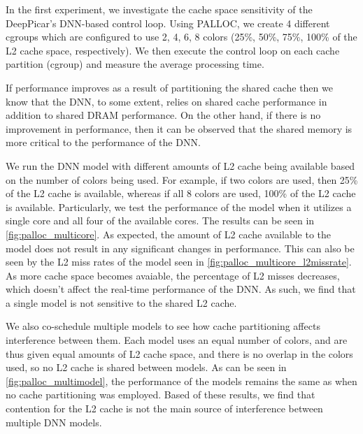 
In the first experiment, we investigate the cache space sensitivity of
the DeepPicar's DNN-based control loop. Using PALLOC, we create 4
different cgroups which are configured to use 2, 4,
6, 8 colors (25\%, 50\%, 75\%, 100\% of the L2 cache
space, respectively). We then execute the control loop on each cache
partition (cgroup) and measure the average processing time. 

If performance improves as a result of partitioning the shared cache 
then we know that the DNN, to some extent, relies on shared cache 
performance in addition to shared DRAM performance. On the other 
hand, if there is no improvement in performance, then it can be 
observed that the shared memory is more critical to the performance 
of the DNN.

We run the DNN model with different amounts of L2 cache being
available based on the number of colors being used. For example, if two 
colors are used, then 25\% of the L2 cache is available, whereas if all 
8 colors are used, 100\% of the L2 cache is available. Particularly, we 
test the performance of the model when it utilizes a single core and
all four of the available cores. The results can be seen in 
\ref{fig:palloc_multicore}. As expected, the amount of L2 cache 
available to the model does not result in any significant changes in 
performance. This can also be seen by the L2 miss rates of the model 
seen in \ref{fig:palloc_multicore_l2missrate}. As more cache space 
becomes avaiable, the percentage of L2 misses decreases, which doesn't 
affect the real-time performance of the DNN. As such, we find that a 
single model is not sensitive to the shared L2 cache.

We also co-schedule multiple models to see how cache partitioning affects
interference between them. Each model uses an equal number of colors, and
are thus given equal amounts of L2 cache space, and there is no overlap
in the colors used, so no L2 cache is shared between models. As can be 
seen in \ref{fig:palloc_multimodel}, the performance of the models 
remains the same as when no cache partitioning was employed. Based of 
these results, we find that contention for the L2 cache is not the main
source of interference between multiple DNN models.

